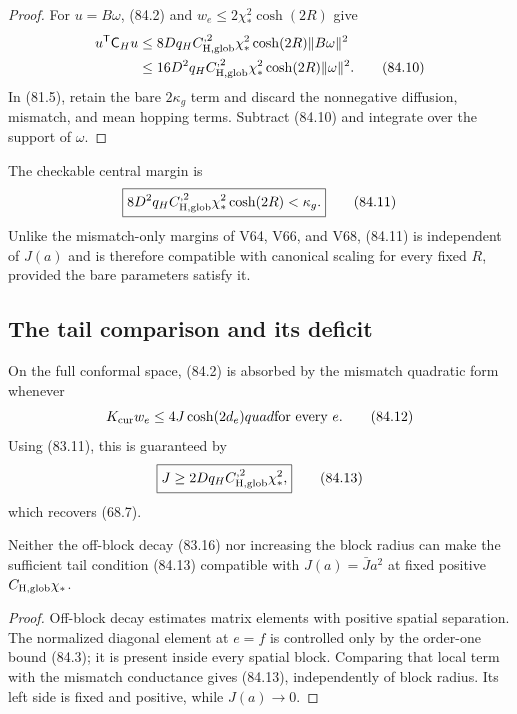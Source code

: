 \documentclass[11pt]{article}
\theoremstyle{remark}
\begin{document}
\begin{proof}
For \(u=B\omega\), (84.2) and
\(w_e\leq2\chi_*^2\cosh(2R)\) give
\[
\begin{aligned}
 u^{\mathsf T}\mathsf C_Hu
 &\leq8Dq_HC_{\rm H,glob}^{,2}\chi_*^2
        \cosh(2R)\|B\omega\|^2\\
 &\leq16D^2q_HC_{\rm H,glob}^{,2}\chi_*^2
        \cosh(2R)\|\omega\|^2.                  \tag{84.10}
\end{aligned}
\]
In (81.5), retain the bare \(2\kappa_g\) term and discard the
nonnegative diffusion, mismatch, and mean hopping terms.  Subtract
(84.10) and integrate over the support of \(\omega\).
\end{proof}

The checkable central margin is
\[
\boxed{
 8D^2q_HC_{\rm H,glob}^{,2}\chi_*^2\cosh(2R)
 <\kappa_g.}                                      \tag{84.11}
\]
Unlike the mismatch-only margins of V64, V66, and V68, (84.11) is
independent of \(J(a)\) and is therefore compatible with canonical
scaling for every fixed \(R\), provided the bare parameters satisfy
it.

\subsection{The tail comparison and its deficit}

On the full conformal space, (84.2) is absorbed by the mismatch
quadratic form whenever
\[
 K_{\rm cur}w_e
 \leq4J\cosh(2d_e)quad\text{for every }e.         \tag{84.12}
\]
Using (83.11), this is guaranteed by
\[
\boxed{
 J\geq2Dq_HC_{\rm H,glob}^{,2}\chi_*^2,}         \tag{84.13}
\]
which recovers (68.7).

\begin{countertheorem}
\label{ctr:v17v84-diagonal}
Neither the off-block decay (83.16) nor increasing the block radius can
make the sufficient tail condition (84.13) compatible with
\(J(a)=\bar Ja^2\) at fixed positive
\(C_{\rm H,glob}\chi_*\).
\end{countertheorem}

\begin{proof}
Off-block decay estimates matrix elements with positive spatial
separation.  The normalized diagonal element at \(e=f\) is controlled
only by the order-one bound (84.3); it is present inside every spatial
block.  Comparing that local term with the mismatch conductance gives
(84.13), independently of block radius.  Its left side is fixed and
positive, while \(J(a)\to0\).
\end{proof}
\end{document}
